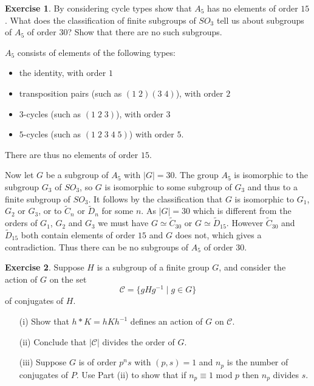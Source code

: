 \documentclass{amsart}
\renewcommand{\:}{\colon}
\newcommand{\CC}{\mathcal{C}}
\theoremstyle{definition}
\newtheorem{exercise}{Exercise}
\newenvironment{solution}{{\noindent\bf Solution:}}{}
\begin{document}
\begin{exercise}
 By considering cycle types show that $A_5$ has no elements of order
 $15$.  What does the classification of finite subgroups of $SO_3$
 tell us about subgroups of $A_5$ of order $30$?  Show that there are
 no such subgroups. 
\end{exercise}
\begin{solution}
 $A_5$ consists of elements of the following types:
 \begin{itemize}
 \item the identity, with order $1$
 \item transposition pairs (such as $(1\;2)(3\;4)$), with order $2$
 \item $3$-cycles (such as $(1\;2\;3)$), with order $3$
 \item $5$-cycles (such as $(1\;2\;3\;4\;5)$) with order $5$.
 \end{itemize}
 There are thus no elements of order $15$.  

 Now let $G$ be a subgroup of $A_5$ with $|G|=30$.  The group $A_5$ is
 isomorphic to the subgroup $G_3$ of $SO_3$, so $G$ is isomorphic to
 some subgroup of $G_3$ and thus to a finite subgroup of $SO_3$.  It
 follows by the classification that $G$ is isomorphic to $G_1$, $G_2$
 or $G_3$, or to $\widetilde{C}_n$ or $\widetilde{D}_n$ for some $n$.
 As $|G|=30$ which is different from the orders of $G_1$, $G_2$ and
 $G_3$ we must have $G\simeq\widetilde{C}_{30}$ or
 $G\simeq\widetilde{D}_{15}$.  However $\widetilde{C}_{30}$ and
 $\widetilde{D}_{15}$ both contain elements of order $15$ and $G$ does
 not, which gives a contradiction.  Thus there can be no subgroups of
 $A_5$ of order $30$.
\end{solution}

\begin{exercise}
 Suppose $H$ is a subgroup of a finite group $G$, and consider the
 action of $G$ on the set
 \[ \CC =\{ g H g^{-1}\; | \; g \in G\} \]
 of conjugates of $H$.
 \begin{itemize}
  \item[(i)] Show that $h*K =hKh^{-1}$ defines an action of $G$ on $\CC$.
  \item[(ii)] Conclude that $|\CC|$ divides the order of $G$.
  \item[(iii)] Suppose $G$ is of order $p^ns$ with $(p,s)=1$ and $n_p$
   is the number of conjugates of $P$.  Use Part (ii) to show that if
   $n_p\equiv 1$ mod $p$ then $n_p$ divides $s$.
 \end{itemize}
\end{exercise}
\begin{solution}

\end{solution}
\end{document}
